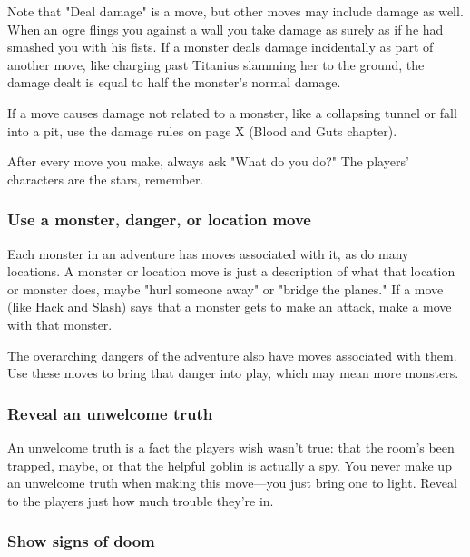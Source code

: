  

Note that "Deal damage" is a move, but other moves may include damage as well. When an ogre flings you against a wall you take damage as surely as if he had smashed you with his fists. If a monster deals damage incidentally as part of another move, like charging past Titanius slamming her to the ground, the damage dealt is equal to half the monster's normal damage.

 

If a move causes damage not related to a monster, like a collapsing tunnel or fall into a pit, use the damage rules on page X (Blood and Guts chapter).

 

After every move you make, always ask "What do you do?" The players' characters are the stars, remember.

 
\subsubsection{Use a monster, danger, or location move}      
 

Each monster in an adventure has moves associated with it, as do many locations. A monster or location move is just a description of what that location or monster does, maybe "hurl someone away" or "bridge the planes." If a move (like Hack and Slash) says that a monster gets to make an attack, make a move with that monster.

 

The overarching dangers of the adventure also have moves associated with them. Use these moves to bring that danger into play, which may mean more monsters.

 
\subsubsection{Reveal an unwelcome truth}     
 

An unwelcome truth is a fact the players wish wasn't true: that the room's been trapped, maybe, or that the helpful goblin is actually a spy. You never make up an unwelcome truth when making this move—you just bring one to light. Reveal to the players just how much trouble they're in.

 
\subsubsection{Show signs of doom}     
 


